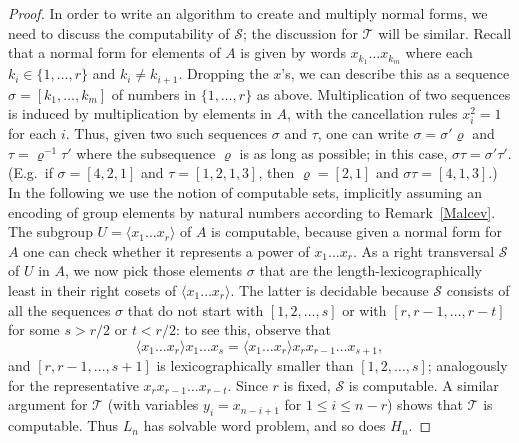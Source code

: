\documentclass[10pt,a4paper]{amsart}
\newcommand{\la}{\langle}
\newcommand{\ra}{\rangle}
\newcommand{\sss}{\sigma}
\begin{document}
\begin{proof}
In order to   write an algorithm to create and multiply normal forms, we need to discuss the computability of $\mathcal{S}$; the discussion for $\mathcal{T}$ will be similar.  Recall that a  normal form for elements of $A$ is given by words $x_{k_1} \ldots x_{k_m}$ where each $k_i \in \{1, \ldots, r\}$ and $k_i \neq k_{i+1}$. Dropping the $x$'s, we can describe this as a sequence $\sss=[k_1, \ldots, k_m]$ of numbers in $\{1, \ldots, r\}$ as above. Multiplication of two sequences is induced by multiplication by elements in $A$, with the cancellation rules $x_i^2=1$ for each $i$. Thus, given two such sequences $\sigma$ and $\tau$, one can write $\sigma=\sigma'\varrho$ and $\tau=\varrho^{-1}\tau'$ where the subsequence $\varrho$ is as long as possible; in this case, $\sigma\tau=\sigma'\tau'$. (E.g.\ if $\sigma=[4,2,1]$ and $\tau=[1,2,1,3]$, then $\varrho=[2,1]$ and  $\sigma\tau=[4,1,3]$.) In the following we  use the notion of computable sets, implicitly assuming an encoding of group elements by natural numbers according to Remark~\ref{Malcev}. The subgroup $U = \la x_1 \ldots x_r \ra$ of $A$  is   computable, because given a normal form for $A$ one can check whether it  represents a power of $x_1 \ldots x_r$. As   a right transversal $\mathcal{S}$ of $U$ in $A$, we now pick those elements $\sss$ that are the length-lexicographically least in their right cosets of $\la x_1 \ldots x_r\ra  $. The latter is decidable because $\mathcal{S}$ consists of  all the sequences $\sss$ that do not start with $[1, 2,\ldots, s]$ or with $[r,r-1,\ldots,r-t]$ for some $s> r/2$ or $t< r/2$: to see this, observe that  \[\langle x_1\ldots x_r\rangle x_1\ldots x_s = \langle x_1\ldots x_r\rangle x_r x_{r-1}\ldots x_{s+1},\] and $[r,r-1,\ldots,s+1]$ is lexicographically smaller than $[1,2,\ldots,s]$; analogously for the representative $x_rx_{r-1}\ldots x_{r-t}$.  Since $r$ is fixed, $\mathcal{S}$ is computable. A similar argument for $\mathcal{T}$ (with variables $y_i = x_{n-i+1}$ for $1\le i \le n-r$) shows that $\mathcal{T}$ is computable. Thus $L_n$ has solvable word problem, and  so does  $H_n$.
\end{proof}
\end{document}
